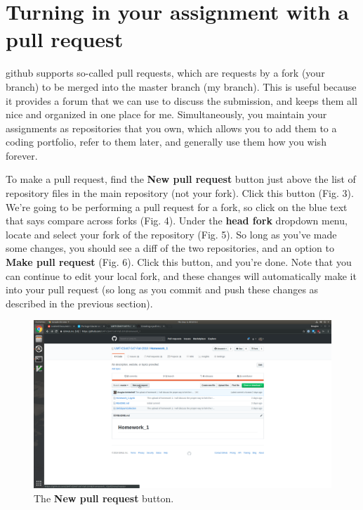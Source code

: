 \documentclass{article}
\begin{document}
\newpage

\section{Turning in your assignment with a pull request}
github supports so-called pull requests, which are requests by a fork (your branch) to be merged into the master branch (my branch).  This is useful because it provides a forum that we can use to discuss the submission, and keeps them all nice and organized in one place for me.  Simultaneously, you maintain your assignments as repositories that you own, which allows you to add them to a coding portfolio, refer to them later, and generally use them how you wish forever.  

To make a pull request, find the \textbf{New pull request} button just above the list of repository files in the main repository (not your fork).  Click this button (Fig. 3).  We're going to be performing a pull request for a fork, so click on the blue text that says compare across forks (Fig. 4).  Under the \textbf{head fork} dropdown menu, locate and select your fork of the repository (Fig. 5).  So long as you've made some changes, you should see a diff of the two repositories, and an option to \textbf{Make pull request} (Fig. 6).  Click this button, and you're done.  Note that you can continue to edit your local fork, and these changes will automatically make it into your pull request (so long as you commit and push these changes as described in the previous section).  
\begin{figure}[h!]
\includegraphics[width=\linewidth]{pull_request_1.png}
\caption{The \textbf{New pull request} button.}
\end{figure}
\end{document}

